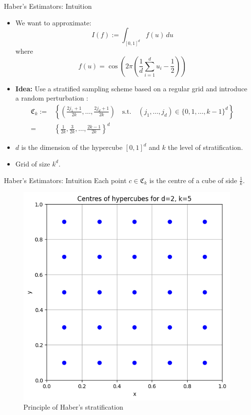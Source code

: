 \documentclass[aspectratio=169,xcolor=dvipsnames]{beamer}
\begin{document}
    \begin{frame}{Haber's Estimators: Intuition}
        \begin{itemize}
            \item<1-> We want to approximate:
            \[
            I(f) := \int_{[0,1]^d} f(u) \, du
            \]
            where \[
            f(u) = \cos\left(2\pi \left(\frac{1}{d} \sum_{i=1}^{d} u_i - \frac{1}{2}\right)\right)
            \]
            \item<2-> \textbf{Idea:} Use a stratified sampling scheme based on a regular grid and introduce a random perturbation :
            $$\begin{aligned} \mathfrak{C}_k := &\left\{\left(\frac{2j_1 + 1}{2k}, \dots, \frac{2j_d + 1}{2k}\right) \quad \text{s.t.} \quad (j_1, \dots, j_d) \in \{0, 1, \dots, k - 1\}^d\right\} \\ = &\left\{\frac{1}{2k}, \frac{3}{2k}, \dots, \frac{2k - 1}{2k}\right\}^d \end{aligned}$$
            \item<3-> $d$ is the dimension of the hypercube $[0,1]^d$ and $k$ the level of stratification.
            \item<4-> Grid of size $k^d$.  
        \end{itemize}


    
            
    \end{frame}

    \begin{frame}{Haber's Estimators: Intuition}
        Each point \( c \in \mathfrak{C}_k \) is the centre of a cube of side \( \frac{1}{k} \).  

        \begin{figure}
            \centering
            \includegraphics[width=0.4\linewidth]{points3.png}
            \caption{Principle of Haber's stratification}
            \label{fig:3}
        \end{figure}
    \end{frame}
\end{document}

